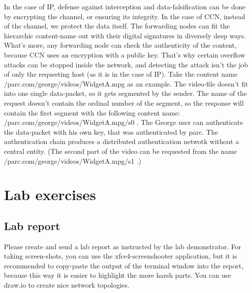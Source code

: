 \documentclass[a4paper]{article}
\begin{document}
In the case of IP, defense against interception and data-falsification can be done by encrypting the
channel, or ensuring its integrity. In the case of CCN, instead of the channel, we protect the
data itself. The forwarding nodes can fit the hierarchic content-name out with their digital 
signatures in diversely deep ways. What's more, any forwarding node can check the authenticity of the
content, because CCN uses an encryption with a public key. That's why certain overflow attacks can be
stopped inside the network, and detecting the attack isn't the job of only the requesting host (as 
it is in the case of IP). Take the content name /parc.com/george/videos/WidgetA.mpg as an example.
The video-file doesn't fit into one single data-packet, so it gets segmented by the sender. The name
of the request doesn't contain the ordinal number of the segment, so the response will contain the
first segment with the following content name: /parc.com/george/videos/WidgetA.mpg/s0 . The George
user can authenticate the data-packet with his own key, that was authenticated by parc. The 
authentication chain produces a distributed authentication netwotk without a central entity. (The 
second part of the video can be requested from the name /parc.com/george/videos/WidgetA.mpg/s1 .)





\appendix

\section{Lab exercises}


\subsection{Lab report}

Please create and send a lab report as instructed by the lab demonstrator. For taking screen-shots, you can use the xfce4-screenshooter application, but it is 
recommended to copy-paste the output of the terminal window into the report, because this way it is
easier to highlight the more harsh parts. You can use draw.io to create nice network topologies.
\end{document}
